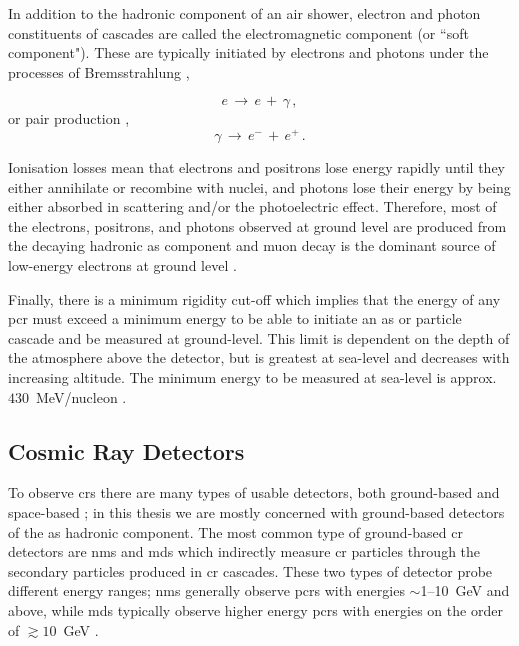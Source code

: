 
In addition to the hadronic component of an air shower, electron and photon constituents of cascades are called the electromagnetic component (or ``soft component"). These are typically initiated by electrons and photons under the processes of Bremsstrahlung \citep{grupen_astroparticle_2005},

\begin{equation}
\label{eq:bremss}
e \, \rightarrow \, e \, + \, \gamma \, ,
\end{equation}
%
or pair production \citep{grupen_astroparticle_2005},
%
\begin{equation}
\label{eq:pair_prod}
\gamma \, \rightarrow \, e^- \, + \, e^+ \, .
\end{equation}

Ionisation losses mean that electrons and positrons lose energy rapidly until they either annihilate or recombine with nuclei, and photons lose their energy by being either absorbed in scattering and/or the photoelectric effect. Therefore, most of the electrons, positrons,
and photons observed at ground level are produced from the decaying hadronic \gls{as} component and muon decay is the dominant source of low-energy electrons at ground level \citep{particle_data_group_review_2020}.

Finally, there is a minimum rigidity cut-off which implies that the energy of any \gls{pcr} must exceed a minimum energy to be able to initiate an \gls{as} or particle cascade and be measured at ground-level. This limit is dependent on the depth of the atmosphere above the detector, but is greatest at sea-level and decreases with increasing altitude. The minimum energy to be measured at sea-level is approx. $430$~MeV/nucleon \citep{dorman_theory_2004, dorman_experimental_2004, poluianov_gle_2017}.



\subsection{Cosmic Ray Detectors}

To observe \glspl{cr} there are many types of usable detectors, both ground-based and space-based \citep{schrijver_heliophysics_2010}; in this thesis we are mostly concerned with ground-based detectors of the \gls{as} hadronic component. The most common type of ground-based \gls{cr} detectors are \glspl{nm} and \glspl{md} which indirectly measure \gls{cr} particles through the secondary particles produced in \gls{cr} cascades. These two types of detector probe different energy ranges; \glspl{nm} generally observe \glspl{pcr} with energies $\sim$1--10~GeV and above, while \glspl{md} typically observe higher energy \glspl{pcr} with energies on the order of $\gtrsim10$~GeV \citep{kuwabara_real-time_2006, rockenbach_global_2014}.

